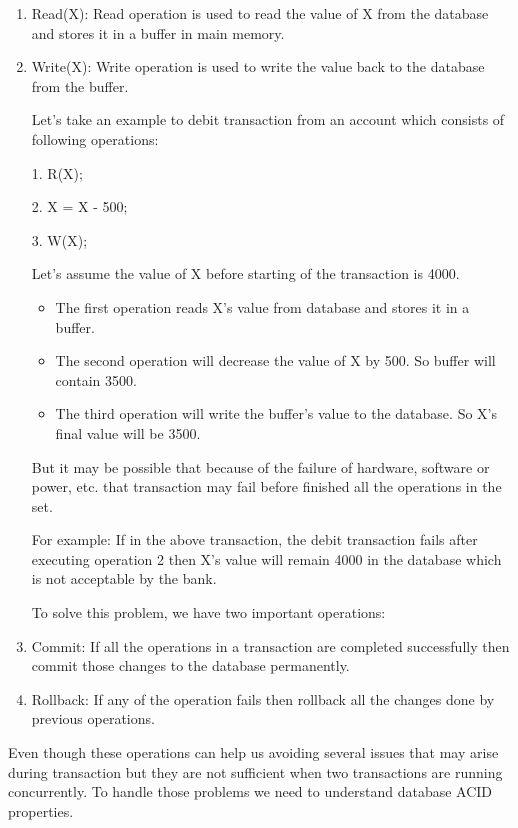\documentclass{article}
\begin{document}
\begin{enumerate}


\item Read(X): Read operation is used to read the value of X from the database and stores it in a buffer in main memory.

\item Write(X): Write operation is used to write the value back to the database from the buffer.

Let's take an example to debit transaction from an account which consists of following operations:

1.  R(X); 
 
2.  X = X - 500;  

3.  W(X);  

Let's assume the value of X before starting of the transaction is 4000.
\begin{itemize}

\item The first operation reads X's value from database and stores it in a buffer.
\item The second operation will decrease the value of X by 500. So buffer will contain 3500.
\item The third operation will write the buffer's value to the database. So X's final value will be 3500.
\end{itemize}

But it may be possible that because of the failure of hardware, software or power, etc. that transaction may fail before finished all the operations in the set.

For example: If in the above transaction, the debit transaction fails after executing operation 2 then X's value will remain 4000 in the database which is not acceptable by the bank.

To solve this problem, we have two important operations:

\item Commit:  If all the operations in a transaction are completed successfully then commit those changes to the database permanently. 

\item Rollback:  If any of the operation fails then rollback all the changes done by previous
operations. 

\end{enumerate}

Even though these operations can help us avoiding several issues that may arise during
transaction but they are not sufficient when two transactions are running concurrently. To
handle those problems we need to understand database ACID properties.
\end{document}
